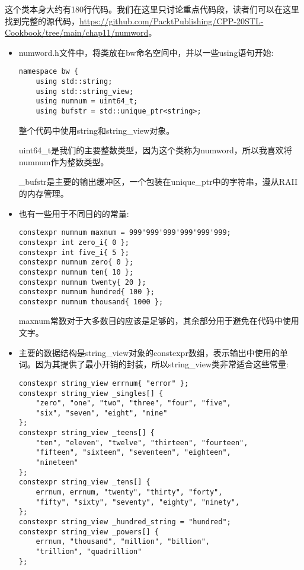 这个类本身大约有180行代码。我们在这里只讨论重点代码段，读者们可以在这里找到完整的源代码，\url{https://github.com/PacktPublishing/CPP-20STL-Cookbook/tree/main/chap11/numword}。

\begin{itemize}
\item 
numword.h文件中，将类放在bw命名空间中，并以一些using语句开始:

\begin{lstlisting}[style=styleCXX]
namespace bw {
	using std::string;
	using std::string_view;
	using numnum = uint64_t;
	using bufstr = std::unique_ptr<string>;
\end{lstlisting}

整个代码中使用string和string\_view对象。

uint64\_t是我们的主要整数类型，因为这个类称为numword，所以我喜欢将numnum作为整数类型。

\_bufstr是主要的输出缓冲区，一个包装在unique\_ptr中的字符串，遵从RAII的内存管理。

\item 
也有一些用于不同目的的常量:

\begin{lstlisting}[style=styleCXX]
constexpr numnum maxnum = 999'999'999'999'999'999;
constexpr int zero_i{ 0 };
constexpr int five_i{ 5 };
constexpr numnum zero{ 0 };
constexpr numnum ten{ 10 };
constexpr numnum twenty{ 20 };
constexpr numnum hundred{ 100 };
constexpr numnum thousand{ 1000 };
\end{lstlisting}

maxnum常数对于大多数目的应该是足够的，其余部分用于避免在代码中使用文字。

\item 
主要的数据结构是string\_view对象的constexpr数组，表示输出中使用的单词。因为其提供了最小开销的封装，所以string\_view类非常适合这些常量:

\begin{lstlisting}[style=styleCXX]
constexpr string_view errnum{ "error" };
constexpr string_view _singles[] {
	"zero", "one", "two", "three", "four", "five",
	"six", "seven", "eight", "nine"
};
constexpr string_view _teens[] {
	"ten", "eleven", "twelve", "thirteen", "fourteen",
	"fifteen", "sixteen", "seventeen", "eighteen",
	"nineteen"
};
constexpr string_view _tens[] {
	errnum, errnum, "twenty", "thirty", "forty",
	"fifty", "sixty", "seventy", "eighty", "ninety",
};
constexpr string_view _hundred_string = "hundred";
constexpr string_view _powers[] {
	errnum, "thousand", "million", "billion",
	"trillion", "quadrillion"
};
\end{lstlisting}


\end{itemize}
